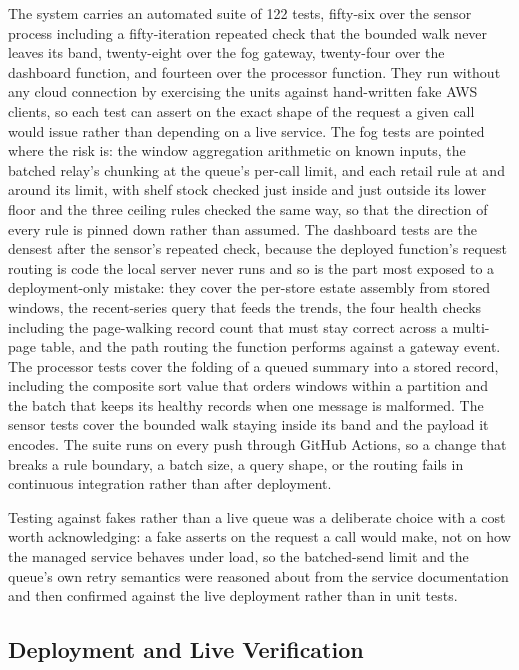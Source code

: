 \documentclass[conference]{IEEEtran}
\begin{document}
The system carries an automated suite of 122 tests, fifty-six over the sensor process including a fifty-iteration repeated check that the bounded walk never leaves its band, twenty-eight over the fog gateway, twenty-four over the dashboard function, and fourteen over the processor function. They run without any cloud connection by exercising the units against hand-written fake AWS clients, so each test can assert on the exact shape of the request a given call would issue rather than depending on a live service. The fog tests are pointed where the risk is: the window aggregation arithmetic on known inputs, the batched relay's chunking at the queue's per-call limit, and each retail rule at and around its limit, with shelf stock checked just inside and just outside its lower floor and the three ceiling rules checked the same way, so that the direction of every rule is pinned down rather than assumed. The dashboard tests are the densest after the sensor's repeated check, because the deployed function's request routing is code the local server never runs and so is the part most exposed to a deployment-only mistake: they cover the per-store estate assembly from stored windows, the recent-series query that feeds the trends, the four health checks including the page-walking record count that must stay correct across a multi-page table, and the path routing the function performs against a gateway event. The processor tests cover the folding of a queued summary into a stored record, including the composite sort value that orders windows within a partition and the batch that keeps its healthy records when one message is malformed. The sensor tests cover the bounded walk staying inside its band and the payload it encodes. The suite runs on every push through GitHub Actions, so a change that breaks a rule boundary, a batch size, a query shape, or the routing fails in continuous integration rather than after deployment.

Testing against fakes rather than a live queue was a deliberate choice with a cost worth acknowledging: a fake asserts on the request a call would make, not on how the managed service behaves under load, so the batched-send limit and the queue's own retry semantics were reasoned about from the service documentation \cite{awssqs} and then confirmed against the live deployment rather than in unit tests.

\subsection{Deployment and Live Verification}
\end{document}
